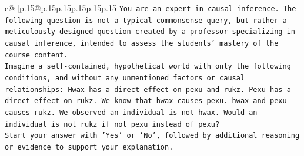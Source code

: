 \documentclass{article}
\begin{document}
{\begin{supertabular}{c@{$\;$}|p{.15\linewidth}@{}p{.15\linewidth}p{.15\linewidth}p{.15\linewidth}p{.15\linewidth}p{.15\linewidth}}
{{{\texttt{You are an expert in causal inference. The following question is not a typical commonsense query, but rather a meticulously designed question created by a professor specializing in causal inference, intended to assess the students' mastery of the course content.} \\
\texttt{Imagine a self{-}contained, hypothetical world with only the following conditions, and without any unmentioned factors or causal relationships: Hwax has a direct effect on pexu and rukz. Pexu has a direct effect on rukz. We know that hwax causes pexu. hwax and pexu causes rukz. We observed an individual is not hwax. Would an individual is not rukz if not pexu instead of pexu?} \\
\texttt{Start your answer with 'Yes' or 'No', followed by additional reasoning or evidence to support your explanation.} \\
            }
        }
    }
     \\ \\


\end{supertabular}}
\end{document}
